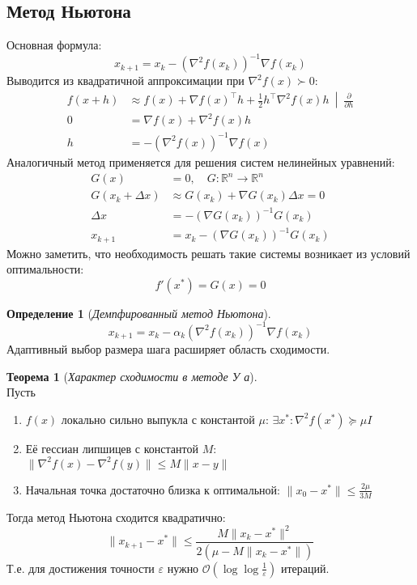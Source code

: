 \documentclass[11pt,a4paper]{report}
\def\eps{\varepsilon}
\def\Real{\mathbb{R}}
\def\le{\leqslant}
\theoremstyle{definition}
\theoremstyle{definition}
\newtheorem{theorem}{Теорема}[section]
\theoremstyle{definition}
\newtheorem*{definition}{Определение}
\begin{document}
	\subsection{Метод Ньютона}
	Основная формула: 
	$$
		x_{k+1} = x_{k} - (\nabla^2 f(x_k))^{-1} \nabla f(x_{k})
	$$
	Выводится из квадратичной аппроксимации при $ \nabla^2 f(x) \succ 0 $:
	\begin{align*}
		f(x + h) &\approx \left. f(x) + \nabla f(x)^{\top} h + \frac{1}{2} h^{\top} \nabla^2 f(x) h\ \middle|\ \frac{\partial}{\partial h} \right.  \\
		0 &= \nabla f(x) + \nabla^2 f(x) h\\
		h &= -(\nabla^2 f(x))^{-1} \nabla f(x)
	\end{align*}
	Аналогичный метод применяется для решения систем нелинейных уравнений:
	\begin{align*}
		G(x) &= 0,\quad G : \Real^{n} \to \Real^{n}\\
		G(x_k + \Delta x) &\approx G(x_k) + \nabla G(x_k) \Delta x = 0\\
		\Delta x &= -(\nabla G(x_k))^{-1} G(x_{k})\\
		x_{k+1} &= x_{k} - (\nabla G(x_k))^{-1} G(x_{k})
	\end{align*}
	Можно заметить, что необходимость решать такие системы возникает из условий оптимальности:
	$$
		f'(x^{*}) = G(x) = 0	
	$$
	\begin{definition}[\textit{Демпфированный метод Ньютона}]
		$$
			x_{k+1} = x_{k} - \alpha_k (\nabla^2 f(x_k))^{-1} \nabla f(x_k)
		$$
		Адаптивный выбор размера шага расширяет область сходимости.
	\end{definition}
	\begin{theorem}[\textit{Характер сходимости в методе У а}]$  $\\
		Пусть 
		\begin{enumerate}
			\item $ f(x) $ локально сильно выпукла с константой $ \mu $: $ \exists x^{*}: \nabla^2 f(x^*) \succeq \mu I $ 
			\item Её гессиан липшицев с константой $ M $: $ \| \nabla^2 f(x) - \nabla^2 f(y) \| \le M \| x - y \| $
			\item Начальная точка достаточно близка к оптимальной: $ \| x_0 - x^* \| \le \frac{2\mu}{3M} $
		\end{enumerate}
		Тогда метод Ньютона сходится квадратично:
		$$
			\| x_{k+1} - x^* \| \le \frac{M \| x_k - x^* \|^2}{2(\mu - M \| x_k - x^* \|)}
		$$
		Т.е. для достижения точности $ \eps $ нужно $ \mathcal{O} \left (\log\log \frac{1}{\eps}\right ) $ итераций.
	\end{theorem}
\end{document}

